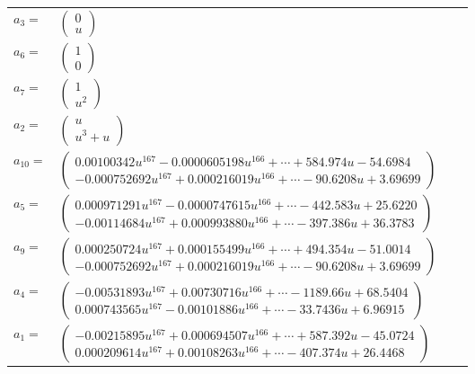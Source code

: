\documentclass[1p]{elsarticle_modified}
\theoremstyle{definition}
\begin{document}
\begin{tabular}{m{7pt} m{180pt} m{7pt} m{180pt} }
\flushright $a_{3}=$&$\begin{pmatrix}0\\u\end{pmatrix}$ \\
\flushright $a_{6}=$&$\begin{pmatrix}1\\0\end{pmatrix}$ \\
\flushright $a_{7}=$&$\begin{pmatrix}1\\u^2\end{pmatrix}$ \\
\flushright $a_{2}=$&$\begin{pmatrix}u\\u^3+u\end{pmatrix}$ \\
\flushright $a_{10}=$&$\begin{pmatrix}0.00100342 u^{167}-0.0000605198 u^{166}+\cdots+584.974 u-54.6984\\-0.000752692 u^{167}+0.000216019 u^{166}+\cdots-90.6208 u+3.69699\end{pmatrix}$ \\
\flushright $a_{5}=$&$\begin{pmatrix}0.000971291 u^{167}-0.0000747615 u^{166}+\cdots-442.583 u+25.6220\\-0.00114684 u^{167}+0.000993880 u^{166}+\cdots-397.386 u+36.3783\end{pmatrix}$ \\
\flushright $a_{9}=$&$\begin{pmatrix}0.000250724 u^{167}+0.000155499 u^{166}+\cdots+494.354 u-51.0014\\-0.000752692 u^{167}+0.000216019 u^{166}+\cdots-90.6208 u+3.69699\end{pmatrix}$ \\
\flushright $a_{4}=$&$\begin{pmatrix}-0.00531893 u^{167}+0.00730716 u^{166}+\cdots-1189.66 u+68.5404\\0.000743565 u^{167}-0.00101886 u^{166}+\cdots-33.7436 u+6.96915\end{pmatrix}$ \\
\flushright $a_{1}=$&$\begin{pmatrix}-0.00215895 u^{167}+0.000694507 u^{166}+\cdots+587.392 u-45.0724\\0.000209614 u^{167}+0.00108263 u^{166}+\cdots-407.374 u+26.4468\end{pmatrix}$ \\

\end{tabular}
\end{document}
